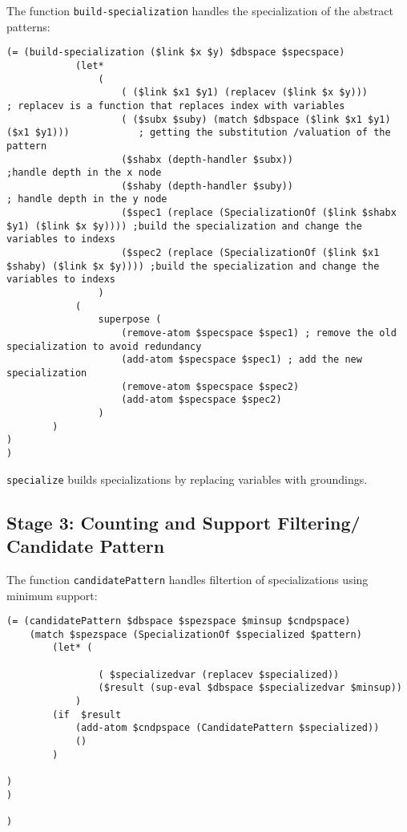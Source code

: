 \documentclass{article}
\begin{document}
The function \texttt{build-specialization} handles the specialization of the abstract patterns:

\begin{verbatim}
(= (build-specialization ($link $x $y) $dbspace $specspace) 
            (let*
                (
                    ( ($link $x1 $y1) (replacev ($link $x $y)))                            ; replacev is a function that replaces index with variables
                    ( ($subx $suby) (match $dbspace ($link $x1 $y1) ($x1 $y1)))            ; getting the substitution /valuation of the pattern
                    ($shabx (depth-handler $subx))                                    ;handle depth in the x node
                    ($shaby (depth-handler $suby))                                    ; handle depth in the y node
                    ($spec1 (replace (SpecializationOf ($link $shabx $y1) ($link $x $y)))) ;build the specialization and change the variables to indexs 
                    ($spec2 (replace (SpecializationOf ($link $x1 $shaby) ($link $x $y)))) ;build the specialization and change the variables to indexs
                )
            (
                superpose (
                    (remove-atom $specspace $spec1) ; remove the old specialization to avoid redundancy
                    (add-atom $specspace $spec1) ; add the new specialization
                    (remove-atom $specspace $spec2)
                    (add-atom $specspace $spec2)
                )
        )
)
)
\end{verbatim}

\texttt{specialize} builds specializations by replacing variables with groundings.

\subsection{Stage 3: Counting and Support Filtering/ Candidate Pattern}

The function \texttt{candidatePattern} handles filtertion of specializations using minimum support:

\begin{verbatim}
(= (candidatePattern $dbspace $spezspace $minsup $cndpspace)
    (match $spezspace (SpecializationOf $specialized $pattern)
        (let* (
                
                ( $specializedvar (replacev $specialized))
                ($result (sup-eval $dbspace $specializedvar $minsup))  
            )
        (if  $result 
            (add-atom $cndpspace (CandidatePattern $specialized))
            ()
        )

)
)

)
\end{verbatim}
\end{document}
